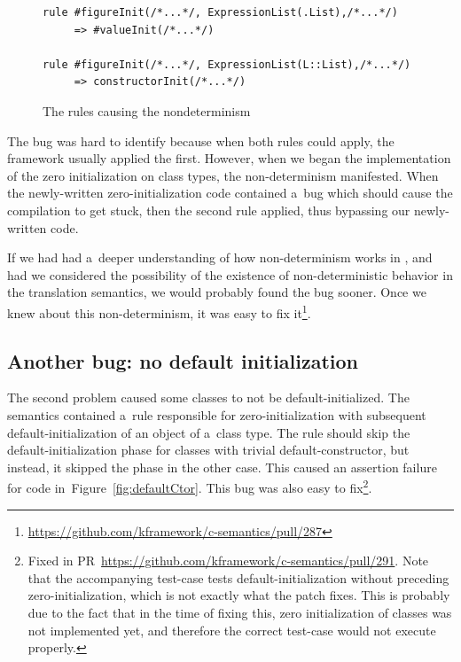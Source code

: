 \documentclass[nolot,nolof,nocover,printed]{fithesis3}
\begin{document}
\begin{figure}[ht]
\begin{lstlisting}
rule #figureInit(/*...*/, ExpressionList(.List),/*...*/)
     => #valueInit(/*...*/)
     
rule #figureInit(/*...*/, ExpressionList(L::List),/*...*/)
     => constructorInit(/*...*/)
\end{lstlisting}
\caption{The rules causing the nondeterminism}
\label{fig:nondetRules}
\end{figure}

The bug was hard to identify because when both rules could apply, the \K framework usually applied the first. However, when we began the implementation of the zero initialization on class types, the non-determinism manifested. When the newly-written zero-initialization code contained a~bug which should cause the compilation to get stuck, then the second rule applied, thus bypassing our newly-written code.

If we had had a~deeper understanding of how non-determinism works in \K, and had we considered the possibility of the existence of non-deterministic behavior in the translation semantics, we would probably found the bug sooner. Once we knew about this non-deter\-minism, it was easy to fix it\footnote{\url{https://github.com/kframework/c-semantics/pull/287}}.


\subsection{Another bug: no default initialization}

The second problem caused some classes to not be default-initialized. The semantics contained a~rule responsible for zero-initialization with subsequent default-initialization of an object of a~class type. The rule should skip the default-initialization phase for classes with trivial default-constructor, but instead, it skipped the phase in the other case. This caused an assertion failure for code in~Figure~\ref{fig:defaultCtor}. This bug was also easy to fix\footnote{Fixed in PR~\url{https://github.com/kframework/c-semantics/pull/291}. Note that the accompanying test-case tests default-initialization without preceding zero-initialization, which is not exactly what the patch fixes. This is probably due to the fact that in the time of fixing this, zero initialization of classes was not implemented yet, and therefore the correct test-case would not execute properly.}.
\end{document}
